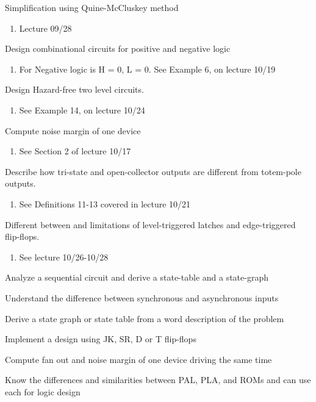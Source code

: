 \documentclass[options]{article}
\newcommand{\cmark}{\ding{51}}%
\newcommand{\done}{\rlap{$\square$}{\raisebox{2pt}{\large\hspace{1pt}\cmark}}%
  \hspace{-2.5pt}}
\begin{document}
\begin{todolist}
  \item[\done]  Simplification using Quine-McCluskey method
    \begin{enumerate}
    \item Lecture 09/28 
    \end{enumerate}
  \item[\done]  Design combinational circuits for positive and negative logic
  \begin{enumerate}
    \item For Negative logic is H = 0, L = 0. See Example 6, on lecture 10/19
  \end{enumerate}
  \item[\done]  Design Hazard-free two level circuits.
  \begin{enumerate}
    \item See Example 14, on lecture 10/24
  \end{enumerate}
  \item[\done] Compute noise margin of one device
  \begin{enumerate}
    \item See Section 2 of lecture 10/17
   \end{enumerate}
  \item[\done] Describe how tri-state and open-collector outputs are different from totem-pole outputs.
    \begin{enumerate}
      \item See Definitions 11-13 covered in lecture 10/21
    \end{enumerate}
  \item[\done] Different between and limitations of level-triggered latches and edge-triggered flip-flops.
  \begin{enumerate}
    \item See lecture 10/26-10/28
  \end{enumerate}
  \item[\done] Analyze a sequential circuit and derive a state-table and a state-graph
  \item[\done] Understand the difference between synchronous and asynchronous inputs
  \item[\done] Derive a state graph or state table from a word description of the problem
  \item[\done] Implement a design using JK, SR, D or T flip-flops
  \item Compute fan out and noise margin of one device driving the same time
  \item Know the differences and similarities between PAL, PLA, and ROMs and can use each for logic design

\end{todolist}
\end{document}
